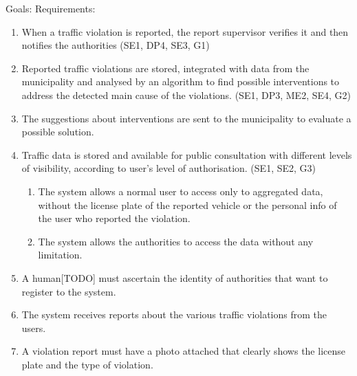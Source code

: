 \bigskip
Goals:
Requirements:
\begin{enumerate}[label={R\arabic*.}]
    \item When a traffic violation is reported, the report supervisor verifies it and then notifies the authorities (SE1, DP4, SE3, G1)
    \item Reported traffic violations are stored, integrated with data from the municipality and analysed by an algorithm to find possible interventions to address the detected main cause of the violations. (SE1, DP3, ME2, SE4, G2)
    \item The suggestions about interventions are sent to the municipality to evaluate a possible solution.
    \item Traffic data is stored and available for public consultation with different levels of visibility, according to user's level of authorisation. (SE1, SE2, G3)
    \begin{enumerate}[label={R\arabic{enumi}.\arabic*.}]
    	\item The system allows a normal user to access only to aggregated data, without the license plate of the reported vehicle or the personal info of the user who reported the violation.
    	\item The system allows the authorities to access the data without any limitation.
    \end{enumerate}
	\item A human[TODO] must ascertain the identity of authorities that want to register to the system.
	\item The system receives reports about the various traffic violations from the users.
	\item A violation report must have a photo attached that clearly shows the license plate and the type of violation. 
\end{enumerate}